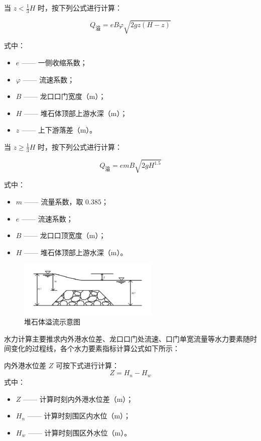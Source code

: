 \documentclass[UTF8, a4paper, 12pt]{ctexart} %
\begin{document}
当 $z < \frac{1}{3}H$ 时，按下列公式进行计算：

\begin{equation}
    Q_{\text{溢}} = e B \varphi \sqrt{2g z (H - z)} 
\end{equation}

式中：
\begin{itemize}
    \item $e$ —— 一侧收缩系数；
    \item $\varphi$ —— 流速系数；
    \item $B$ —— 龙口口门宽度（$\text{m}$）；
    \item $H$ —— 堆石体顶部上游水深（$\text{m}$）；
    \item $z$ —— 上下游落差（$\text{m}$）。
\end{itemize}



当 $z \geq \frac{1}{3}H$ 时，按下列公式进行计算：

\begin{equation}
Q_{\text{溢}} = e m B \sqrt{2g H^{1.5}}  
\end{equation}

式中：
\begin{itemize}
    \item $m$ —— 流量系数，取 $0.385$；
    \item $e$ —— 流速系数；
    \item $B$ —— 龙口口顶宽度（$\text{m}$）；
    \item $H$ —— 堆石体顶部上游水深（$\text{m}$）。
\end{itemize}
\newpage
\begin{figure}[h]
    \centering
    \includegraphics[width=0.6\textwidth]{yiliu.png}
    \caption{堆石体溢流示意图}
    \label{fig:dragon_port_hydraulic_calculation}
\end{figure}

水力计算主要推求内外港水位差、龙口口门处流速、口门单宽流量等水力要素随时间变化的过程线，各个水力要素指标计算公式如下所示：

内外港水位差 $Z$ 可按下式进行计算：
\begin{equation}
    Z = H_n - H_w 
\end{equation}
式中：
\begin{itemize}
    \item $Z$ —— 计算时刻内外港水位差（m）；
    \item $H_n$ —— 计算时刻围区内水位（m）；
    \item $H_w$ —— 计算时刻围区外水位（m）。
\end{itemize}
\end{document}
